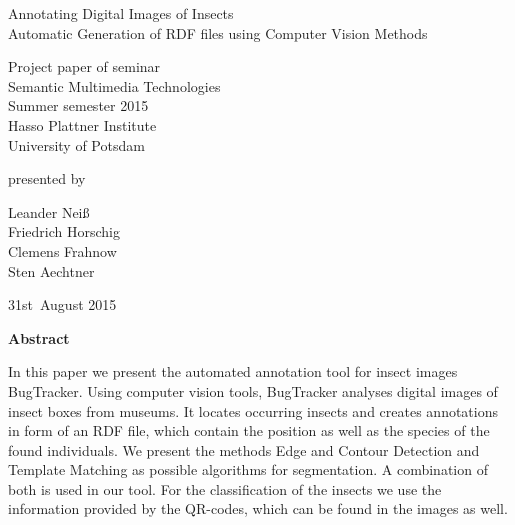 \documentclass[11pt, a4paper]{article}
\begin{document}
          

\begin{titlepage}
  \begin{center} 
    \mbox{}
    \vspace{1cm}
    
    {\huge Annotating Digital Images of Insects \\[1em] {\LARGE Automatic Generation of RDF files using Computer Vision Methods}}  
        
    \vspace{4cm}
    
    Project paper of seminar \\[1em]
    {\large \sc Semantic Multimedia Technologies} \\[1em]
    Summer semester 2015 \\[1em]
    Hasso Plattner Institute \\[1em]
    University of Potsdam
    
    \vspace{4cm}
    
		presented by
		
    \vspace{1em}
    
		{\Large Leander Neiß} \\
		{\Large Friedrich Horschig}\\
		{\Large Clemens Frahnow}\\
		{\Large Sten Aechtner}
		
    \vspace{4em}
    
    31st~August 2015
  \end{center}
\end{titlepage}


\setcounter{page}{1}

\begin{center}
{\bf Abstract} 
\end{center}

\noindent
In this paper we present the automated annotation tool for insect images BugTracker.
Using computer vision tools, BugTracker analyses digital images of insect boxes from museums.
It locates occurring insects and creates annotations in form of an RDF file, which contain the position as well as the species of the found individuals.
We present the methods Edge and Contour Detection and Template Matching as possible algorithms for segmentation.
A combination of both is used in our tool.
For the classification of the insects we use the information provided by the QR-codes, which can be found in the images as well.
\end{document}
